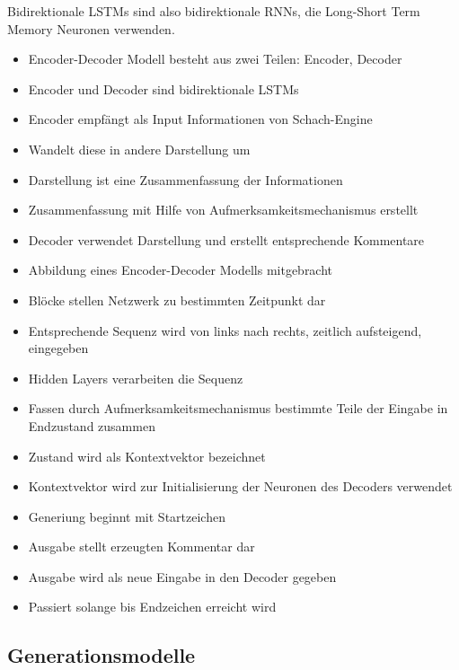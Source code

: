 Bidirektionale LSTMs sind also bidirektionale RNNs, die Long-Short Term Memory Neuronen verwenden.

\newpage

\begin{itemize}[leftmargin=*]
\item Encoder-Decoder Modell besteht aus zwei Teilen: Encoder, Decoder
\item Encoder und Decoder sind bidirektionale LSTMs
\item Encoder empfängt als Input Informationen von Schach-Engine 
\item Wandelt diese in andere Darstellung um
\item Darstellung ist eine Zusammenfassung der Informationen
\item Zusammenfassung mit Hilfe von Aufmerksamkeitsmechanismus erstellt
\item Decoder verwendet Darstellung und erstellt entsprechende Kommentare
\end{itemize}

\newpage

\begin{itemize}[leftmargin=*]
\item Abbildung eines Encoder-Decoder Modells mitgebracht
\item Blöcke stellen Netzwerk zu bestimmten Zeitpunkt dar
\item Entsprechende Sequenz wird von links nach rechts, zeitlich aufsteigend, eingegeben
\item Hidden Layers verarbeiten die Sequenz
\item Fassen durch Aufmerksamkeitsmechanismus bestimmte Teile der Eingabe in Endzustand zusammen
\item Zustand wird als Kontextvektor bezeichnet
\item Kontextvektor wird zur Initialisierung der Neuronen des Decoders verwendet
\item Generiung beginnt mit Startzeichen
\item Ausgabe stellt erzeugten Kommentar dar
\item Ausgabe wird als neue Eingabe in den Decoder gegeben
\item Passiert solange bis Endzeichen erreicht wird
\end{itemize}

\newpage

\subsection{Generationsmodelle}

